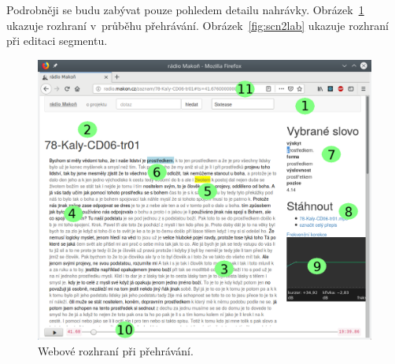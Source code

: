 Podrobněji se budu zabývat pouze pohledem detailu nahrávky.
Obrázek~\ref{fig:scn1lab} ukazuje rozhraní v~průběhu přehrávání.
Obrázek~\ref{fig:scn2lab} ukazuje rozhraní při editaci segmentu.

\begin{figure}[htpb]
\includegraphics[scale=0.7]{rc/radio-makon-cs-1-lab.png}
\caption{Webové rozhraní při přehrávání.}
\label{fig:scn1lab}
\end{figure}

